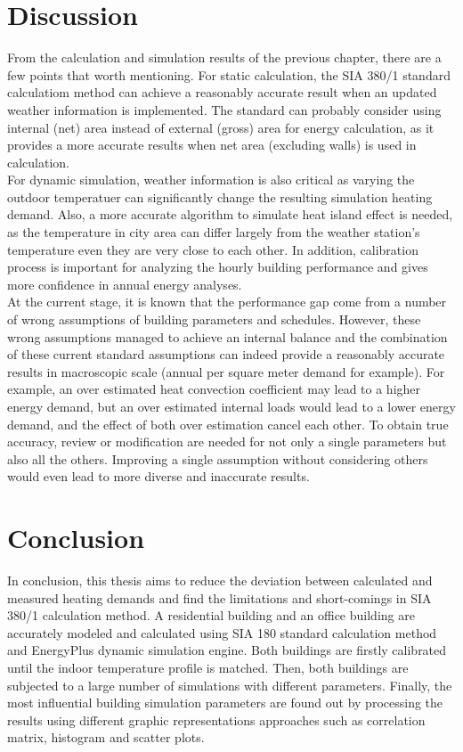 \documentclass[a4paper, oneside]{discothesis}
\begin{document}
\chapter{Discussion}
    From the calculation and simulation results of the previous chapter, there are a few points that worth mentioning. For static calculation, the SIA 380/1 standard calculatiom method can achieve a reasonably accurate result when an updated weather information is implemented. The standard can probably consider using internal (net) area instead of external (gross) area for energy calculation, as it provides a more accurate results when net area (excluding walls) is used in calculation.\\
    
    For dynamic simulation, weather information is also critical as varying the outdoor temperatuer can significantly change the resulting simulation heating demand. Also, a more accurate algorithm to simulate heat island effect is needed, as the temperature in city area can differ largely from the weather station's temperature even they are very close to each other. In addition, calibration process is important for analyzing the hourly building performance and gives more confidence in annual energy analyses.\\
    
    At the current stage, it is known that the performance gap come from a number of wrong assumptions of building parameters and schedules. However, these wrong assumptions managed to achieve an internal balance and the combination of these current standard assumptions can indeed provide a reasonably accurate results in macroscopic scale (annual per square meter demand for example). For example, an over estimated heat convection coefficient may lead to a higher energy demand, but an over estimated internal loads would lead to a lower energy demand, and the effect of both over estimation cancel each other. To obtain true accuracy, review or modification are needed for not only a single parameters but also all the others. Improving a single assumption without considering others would even lead to more diverse and inaccurate results.\\



\chapter{Conclusion}
    In conclusion, this thesis aims to reduce the deviation between calculated and measured heating demands and find the limitations and short-comings in SIA 380/1 calculation method. A residential building and an office building are accurately modeled and calculated using SIA 180 standard calculation method and EnergyPlus dynamic simulation engine. Both buildings are firstly calibrated until the indoor temperature profile is matched. Then, both buildings are subjected to a large number of simulations with different parameters. Finally, the most influential building simulation parameters are found out by processing the results using different graphic representations approaches such as correlation matrix, histogram and scatter plots. \\
\end{document}
